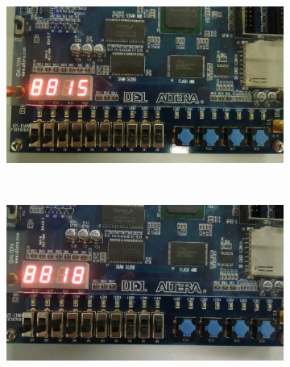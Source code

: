 	\begin{figure}[H]
		\centering

		\begin{subfigure}[b]{0.44\textwidth}
			\includegraphics[width=\textwidth]{img/etapa3/1}
			\label{fig:etapa3-10}
		\end{subfigure}
		~
		\begin{subfigure}[b]{0.44\textwidth}
			\includegraphics[width=\textwidth]{img/etapa3/2}
			\label{fig:etapa3-11}
		\end{subfigure}


\end{figure}
